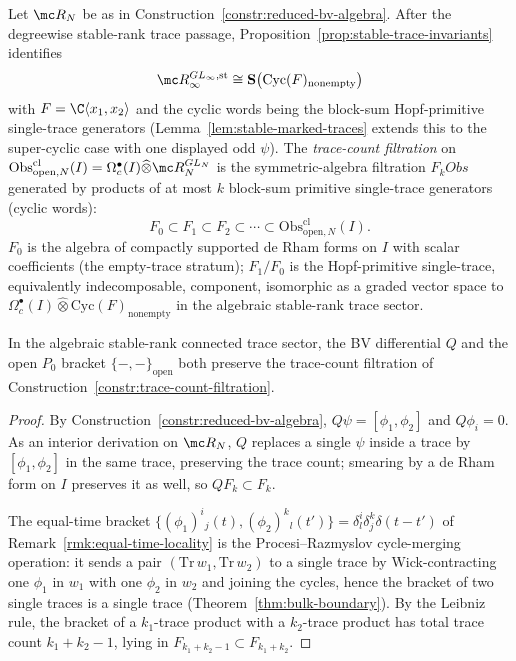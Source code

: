 \begin{constr}\label{constr:trace-count-filtration}
  Let $\mc R_N$ be as in Construction~\ref{constr:reduced-bv-algebra}.
  After the degreewise stable-rank trace passage,
  Proposition~\ref{prop:stable-trace-invariants} identifies
  $$\mc R_\infty^{GL_\infty,\mathrm{st}}
    \cong\mathbf S\bigl(\mathrm{Cyc}(F)_{\mathrm{nonempty}}\bigr)$$
  with $F=\C\langle x_1,x_2\rangle$ and the cyclic words being the
  block-sum Hopf-primitive single-trace generators
  (Lemma~\ref{lem:stable-marked-traces} extends this to the
  super-cyclic case with one displayed odd $\psi$).  The
  \emph{trace-count filtration} on
  $\mathrm{Obs}^{\mathrm{cl}}_{\mathrm{open},N}(I)
   =\Omega^\bullet_c(I)\widehat\otimes\mc R_N^{GL_N}$
  is the symmetric-algebra filtration
  $F_kObs$ generated by products of at most $k$ block-sum primitive
  single-trace generators (cyclic words):
  $$F_0\subset F_1\subset F_2\subset\cdots
    \subset\mathrm{Obs}^{\mathrm{cl}}_{\mathrm{open},N}(I).$$
  $F_0$ is the algebra of compactly supported de Rham forms on $I$ with
  scalar coefficients (the empty-trace stratum);
  $F_1\!\big/F_0$ is the Hopf-primitive single-trace, equivalently
  indecomposable, component, isomorphic as a graded vector space to
  $\Omega^\bullet_c(I)\widehat\otimes\mathrm{Cyc}(F)_{\mathrm{nonempty}}$
  in the algebraic stable-rank trace sector.
\end{constr}

\begin{lem}\label{lem:filtration-preservation}
  In the algebraic stable-rank connected trace sector, the BV
  differential $Q$ and the open $P_0$ bracket
  $\{-,-\}_{\mathrm{open}}$ both preserve the
  trace-count filtration of
  Construction~\ref{constr:trace-count-filtration}.
\end{lem}

\begin{proof}
  By Construction~\ref{constr:reduced-bv-algebra}, $Q\psi=[\phi_1,\phi_2]$
  and $Q\phi_i=0$.  As an interior derivation on $\mc R_N$, $Q$ replaces
  a single $\psi$ inside a trace by $[\phi_1,\phi_2]$ in the same trace,
  preserving the trace count; smearing by a de Rham form on $I$ preserves
  it as well, so $Q F_k\subset F_k$.

  The equal-time bracket
  $\{(\phi_1)^i{}_j(t),(\phi_2)^k{}_l(t')\}=\delta^i_l\delta^k_j\delta(t-t')$
  of Remark~\ref{rmk:equal-time-locality} is the Procesi--Razmyslov
  cycle-merging operation: it sends a pair $(\mathrm{Tr}\,w_1,\mathrm{Tr}\,w_2)$
  to a single trace by Wick-contracting one $\phi_1$ in $w_1$ with one
  $\phi_2$ in $w_2$ and joining the cycles, hence the bracket of two
  single traces is a single trace (Theorem~\ref{thm:bulk-boundary}).
  By the Leibniz rule, the bracket of a $k_1$-trace product with a
  $k_2$-trace product has total trace count $k_1+k_2-1$, lying in
  $F_{k_1+k_2-1}\subset F_{k_1+k_2}$.
\end{proof}

